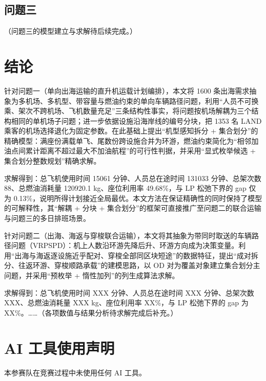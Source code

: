 \documentclass[UTF8,zihao=-4]{ctexart}
\numberwithin{figure}{section}
\numberwithin{table}{section}
\begin{document}
\subsection{问题三}
（问题三的模型建立与求解待后续完成。）

\section{结论}

针对问题一（单向出海运输的直升机运载计划编排），本文将 1600 条出海需求抽象为多机场、多机型、带容量与燃油约束的单向车辆路径问题，利用“人员不可换乘、架次不跨机场、飞机数量充足”三条结构性事实，将问题按机场解耦为三个结构相同的单机场子问题；进一步依据设施沿海岸线的编号分块，把 1353 名 LAND 乘客的机场选择退化为固定参数。在此基础上提出“机型感知拆分 + 集合划分”的精确模型：满座份满载单飞、尾数份跨设施合并为环游，燃油约束简化为“相邻加油点间累计距离不超过最大不加油航程”的可行性判据，并采用“显式枚举候选 + 集合划分整数规划”精确求解。

求解得到：总飞机使用时间 15061 分钟、人员总在途时间 131033 分钟、总架次数 88、总燃油消耗量 120920.1 kg、座位利用率 49.68\%，与 LP 松弛下界的 gap 仅为 0.13\%，说明所得计划接近全局最优。本文方法在保证精确性的同时保持了模型的可解释性，其“解耦 + 分块 + 集合划分”的框架可直接推广至问题二的联合运输与问题三的多日排班场景。

针对问题二（出海、海返与穿梭联合运输），本文将其抽象为带同时取送的车辆路径问题（VRPSPD）：机上人数沿环游先降后升、环游方向成为决策变量。利用“出海与海返逐设施近乎配对、穿梭全部同区块短途”的数据特征，提出“成对拆分、往返环游、穿梭顺路承载”的建模思路，以 OD 对为覆盖对象建立集合划分主问题，并采用“预枚举 + 惰性加列”的列生成算法求解。

求解得到：总飞机使用时间 XXX 分钟、人员总在途时间 XXX 分钟、总架次数 XXX、总燃油消耗量 XXX kg、座位利用率 XX\%，与 LP 松弛下界的 gap 为 XX\%。……（各项数值与结果分析待求解完成后补充。）

\section*{AI 工具使用声明}

本参赛队在竞赛过程中未使用任何 AI 工具。

\end{document}
